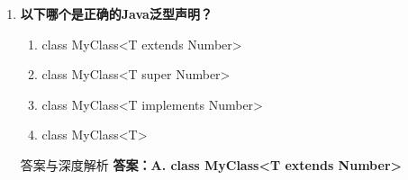 \documentclass[12pt, a4paper]{ctexart}
\begin{document}
\begin{enumerate}[label=\textbf{\arabic*.}]
\begin{bluebox}{答案与深度解析}
\begin{itemize}[leftmargin=*, nosep, label={}]
\begin{itemize}[label={}, leftmargin=*, nosep]
\begin{lstlisting}[language=Java]
// 其他基本类型的包装类
// int -> Integer
// double -> Double
// boolean -> Boolean
// char -> Character
// byte -> Byte
// short -> Short
// long -> Long
// float -> Float
				      \end{lstlisting}
				            \item \textbf{为什么不能支持基本类型}：
				                  \begin{itemize}[label={}, nosep]
					                  \item 类型擦除后基本类型信息丢失
					                  \item JVM泛型实现在字节码层面依赖引用类型
					                  \item 避免复杂的重载和类型系统问题
				                  \end{itemize}
			            \end{itemize}
		      \end{itemize}

		      \textbf{【应背诵知识点】}
		      \begin{itemize}[label={}, nosep]
			      \item 泛型类型参数必须是引用类型
			      \item 基本类型需使用包装类（int->Integer等）
			      \item 泛型类型在运行时被擦除
			      \item 泛型提供编译时类型安全，减少强制转换
			      \item 口诀：泛型只支持引用型，基本类型要装箱，运行类型全擦除，编译安全运行无
		      \end{itemize}

		      \textbf{【命题趋势与实战策略】}
		      \textbf{考场秒杀}：看到"泛型基本数据类型"→错，必须用包装类
	      \end{bluebox}

	      \vspace{1em}

	\item \textbf{以下哪个是正确的Java泛型声明？}
	      \begin{enumerate}[label=\Alph*.]
		      \item class MyClass<T extends Number>
		      \item class MyClass<T super Number>
		      \item class MyClass<T implements Number>
		      \item class MyClass<T>
	      \end{enumerate}

	      \begin{bluebox}{答案与深度解析}
		      \textbf{答案：A. class MyClass<T extends Number>}


\end{bluebox}
\end{enumerate}
\end{document}
